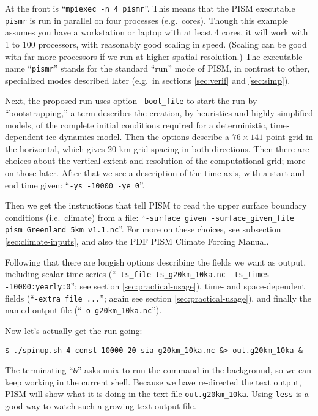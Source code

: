 At the front is ``\texttt{mpiexec -n 4 pismr}''.  This means that the PISM executable \texttt{pismr} is run in parallel on four processes (e.g.~cores).  Though this example assumes you have a workstation or laptop with at least 4 cores, it will work with 1 to 100 processors, with reasonably good scaling in speed.  (Scaling can be good with far more processors if we run at higher spatial resolution.)  The executable name ``\texttt{pismr}'' stands for the standard ``run'' mode of PISM, in contrast to other, specialized modes described later (e.g.~in sections \ref{sec:verif} and \ref{sec:simp}).

Next, the proposed run uses option \texttt{-boot_file} to start the run by ``bootstrapping,'' a term describes the creation, by heuristics and highly-simplified models, of the complete initial conditions required for a deterministic, time-dependent ice dynamics model.  Then the options describe a $76\times 141$ point grid in the horizontal, which gives 20 km grid spacing in both directions.  Then there are choices about the vertical extent and resolution of the computational grid; more on those later.  After that we see a description of the time-axis, with a start and end time given: ``\texttt{-ys -10000 -ye 0}''.

Then we get the instructions that tell PISM to read the upper surface boundary conditions (i.e.~climate) from a file: ``\texttt{-surface given -surface_given_file pism_Greenland_5km_v1.1.nc}''.  For more on these choices, see subsection \ref{sec:climate-inputs}, and also the PDF PISM Climate Forcing Manual.

Following that there are longish options describing the fields we want as output, including scalar time series (``\texttt{-ts_file ts_g20km_10ka.nc -ts_times -10000:yearly:0}''; see section \ref{sec:practical-usage}), time- and space-dependent fields (``\texttt{-extra_file ...}''; again see section \ref{sec:practical-usage}), and finally the named output file (``\texttt{-o g20km_10ka.nc}'').

Now let's actually get the run going:
\begin{verbatim}
$ ./spinup.sh 4 const 10000 20 sia g20km_10ka.nc &> out.g20km_10ka &
\end{verbatim}
\noindent The terminating ``\verb|&|'' asks unix to run the command in the background, so we can keep working in the current shell.  Because we have re-directed the text output, PISM will show what it is doing in the text file \texttt{out.g20km_10ka}.  Using \texttt{less} is a good way to watch such a growing text-output file.



